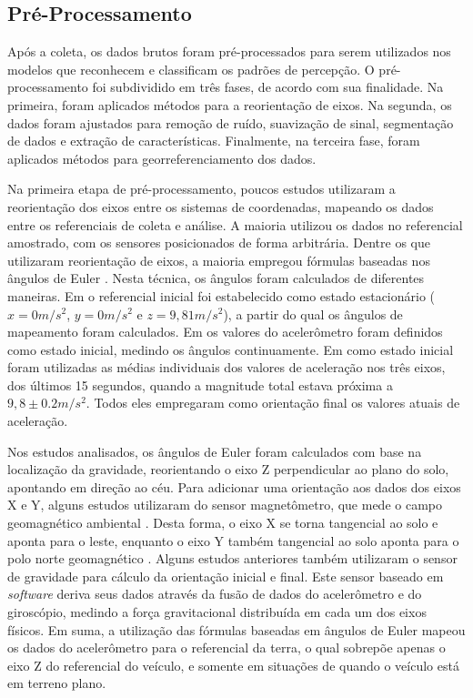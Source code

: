 \subsection{Pré-Processamento}

Após a coleta, os dados brutos foram pré-processados para serem utilizados nos modelos que reconhecem e classificam os padrões de percepção. O pré-processamento foi subdividido em três fases, de acordo com sua finalidade. Na primeira, foram aplicados métodos para a reorientação de eixos. Na segunda, os dados foram ajustados para remoção de ruído, suavização de sinal, segmentação de dados e extração de características. Finalmente, na terceira fase, foram aplicados métodos para georreferenciamento dos dados.

Na primeira etapa de pré-processamento, poucos estudos utilizaram a reorientação dos eixos entre os sistemas de coordenadas, mapeando os dados entre os referenciais de coleta e análise. A maioria utilizou os dados no referencial amostrado, com os sensores posicionados de forma arbitrária. Dentre os que utilizaram reorientação de eixos, a maioria empregou fórmulas baseadas nos ângulos de Euler \cite{Li2018,Orhan2013,Singh2017,Vittorio2014,Vlahogianni2017}. Nesta técnica, os ângulos foram calculados de diferentes maneiras. Em  o referencial inicial foi estabelecido como estado estacionário ($x=0m/s^2$, $y=0m/s^2$ e $z=9,81m/s^2$), a partir do qual os ângulos de mapeamento foram calculados. Em  os valores do acelerômetro foram definidos como estado inicial, medindo os ângulos continuamente. Em  como estado inicial foram utilizadas as médias individuais dos valores de aceleração nos três eixos, dos últimos 15 segundos, quando a magnitude total estava próxima a $9,8 \pm 0.2 m/s^2$. Todos eles empregaram como orientação final os valores atuais de aceleração.

Nos estudos analisados, os ângulos de Euler foram calculados com base na localização da gravidade, reorientando o eixo Z perpendicular ao plano do solo, apontando em direção ao céu. Para adicionar uma orientação aos dados dos eixos X e Y, alguns estudos utilizaram do sensor magnetômetro, que mede o campo geomagnético ambiental \cite{Sattar2018}. Desta forma, o eixo X se torna tangencial ao solo e aponta para o leste, enquanto o eixo Y também tangencial ao solo aponta para o polo norte geomagnético \cite{Sattar2018}. Alguns estudos anteriores também utilizaram o sensor de gravidade para cálculo da orientação inicial e final. Este sensor baseado em \textit{software} deriva seus dados através da fusão de dados do acelerômetro e do giroscópio, medindo a força gravitacional distribuída em cada um dos eixos físicos. Em suma, a utilização das fórmulas baseadas em ângulos de Euler mapeou os dados do acelerômetro para o referencial da terra, o qual sobrepõe apenas o eixo Z do referencial do veículo, e somente em situações de quando o veículo está em terreno plano.

